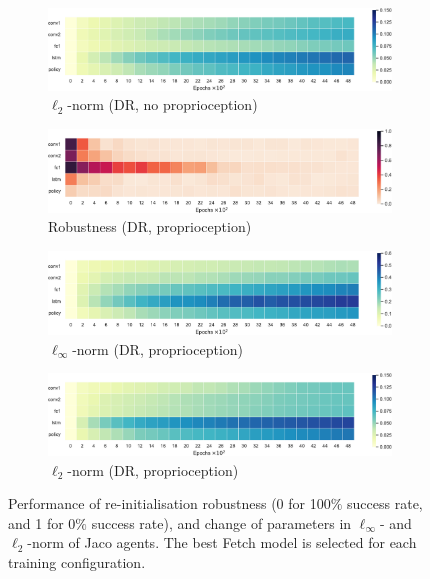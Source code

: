 \begin{figure}[h!]
  \begin{subfigure}{0.32\textwidth}
    \includegraphics[width=\textwidth]{figures/chapter6/robustness/jaco/visual_random/l2_dist}
    \caption{$\ell_2$-norm (DR, no proprioception)}
  \end{subfigure}
  \begin{subfigure}{0.32\textwidth}
    \includegraphics[width=\textwidth]{figures/chapter6/robustness/jaco/sensor_random/error}
    \caption{Robustness (DR, proprioception)}
  \end{subfigure}
  \begin{subfigure}{0.32\textwidth}
    \includegraphics[width=\textwidth]{figures/chapter6/robustness/jaco/sensor_random/inf_dist}
    \caption{$\ell_\infty$-norm (DR, proprioception)}
  \end{subfigure}
  \begin{subfigure}{0.32\textwidth}
    \includegraphics[width=\textwidth]{figures/chapter6/robustness/jaco/sensor_random/l2_dist}
    \caption{$\ell_2$-norm (DR, proprioception)}
  \end{subfigure}
  \caption[Test performance of re-initialisation robustness and change of parameters of Jaco agents.]{Performance of re-initialisation robustness (0 for 100$\%$ success rate, and 1 for 0$\%$ success rate), and change of parameters in $\ell_\infty$- and $\ell_2$-norm of Jaco agents. The best Fetch model is selected for each training configuration.}
  \label{fig:jaco_robustness}
\end{figure}

